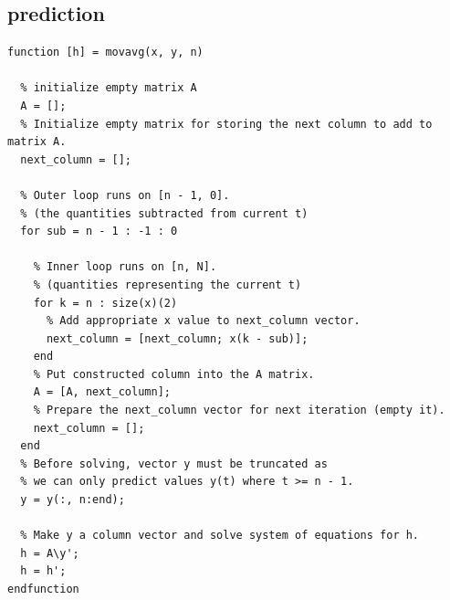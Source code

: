 \documentclass{article}
\begin{document}
\subsection{prediction}
\begin{footnotesize}
\begin{verbatim}
function [h] = movavg(x, y, n)

  % initialize empty matrix A
  A = [];
  % Initialize empty matrix for storing the next column to add to matrix A.
  next_column = [];
  
  % Outer loop runs on [n - 1, 0].
  % (the quantities subtracted from current t)
  for sub = n - 1 : -1 : 0
  
    % Inner loop runs on [n, N].
    % (quantities representing the current t)
    for k = n : size(x)(2)
      % Add appropriate x value to next_column vector.
      next_column = [next_column; x(k - sub)];
    end
    % Put constructed column into the A matrix.
    A = [A, next_column];
    % Prepare the next_column vector for next iteration (empty it).
    next_column = [];   
  end
  % Before solving, vector y must be truncated as
  % we can only predict values y(t) where t >= n - 1.
  y = y(:, n:end);
  
  % Make y a column vector and solve system of equations for h.
  h = A\y';
  h = h';
endfunction
\end{verbatim}
\end{footnotesize}
\end{document}
